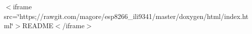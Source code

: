 $<$iframe src=\char`\"{}https;//rawgit.\-com/magore/esp8266\-\_\-ili9341/master/doxygen/html/index.\-html\char`\"{}$>$R\-E\-A\-D\-M\-E$<$/iframe$>$ 